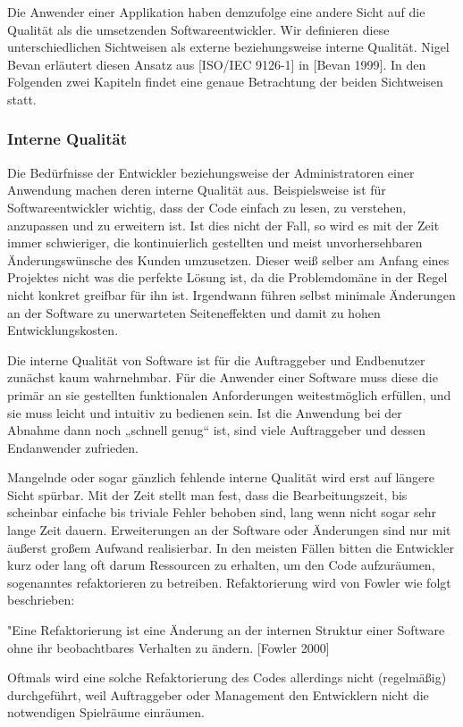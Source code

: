 Die Anwender einer Applikation haben demzufolge eine andere Sicht auf die Qualität als die umsetzenden Softwareentwickler. Wir definieren diese unterschiedlichen Sichtweisen als externe beziehungsweise interne Qualität. Nigel Bevan erläutert diesen Ansatz aus [ISO/IEC 9126-1] in [Bevan 1999]. In den Folgenden zwei Kapiteln findet eine genaue Betrachtung der beiden Sichtweisen statt.

\subsubsection{Interne Qualität}
Die Bedürfnisse der Entwickler beziehungsweise der Administratoren einer Anwendung machen deren interne Qualität aus. Beispielsweise ist für Softwareentwickler wichtig, dass der Code einfach zu lesen, zu verstehen, anzupassen und zu erweitern ist. Ist dies nicht der Fall, so wird es mit der Zeit immer schwieriger, die kontinuierlich gestellten und meist unvorhersehbaren Änderungswünsche des Kunden umzusetzen. Dieser weiß selber am Anfang eines Projektes nicht was die perfekte Lösung ist, da die Problemdomäne in der Regel nicht konkret greifbar für ihn ist. Irgendwann führen selbst minimale Änderungen an der Software zu unerwarteten Seiteneffekten und damit zu hohen Entwicklungskosten.

Die interne Qualität von Software ist für die Auftraggeber und Endbenutzer zunächst kaum wahrnehmbar. Für die Anwender einer Software muss diese die primär an sie gestellten funktionalen Anforderungen weitestmöglich erfüllen, und sie muss leicht und intuitiv zu bedienen sein. Ist die Anwendung bei der Abnahme dann noch „schnell genug“ ist, sind viele Auftraggeber und dessen Endanwender zufrieden.

Mangelnde oder sogar gänzlich fehlende interne Qualität wird erst auf längere Sicht spürbar. Mit der Zeit stellt man fest, dass die Bearbeitungszeit, bis scheinbar einfache bis triviale Fehler behoben sind, lang wenn nicht sogar sehr lange Zeit dauern. Erweiterungen an der Software oder Änderungen sind nur mit äußerst großem Aufwand realisierbar. In den meisten Fällen bitten die Entwickler kurz oder lang oft darum Ressourcen zu erhalten, um den Code aufzuräumen, sogenanntes refaktorieren zu betreiben. Refaktorierung wird von Fowler wie folgt beschrieben: 

"Eine Refaktorierung ist eine Änderung an der internen Struktur einer Software ohne ihr beobachtbares Verhalten zu ändern. [Fowler 2000]

Oftmals wird eine solche Refaktorierung des Codes allerdings nicht (regelmäßig) durchgeführt, weil Auftraggeber oder Management den Entwicklern nicht die notwendigen Spielräume einräumen.

